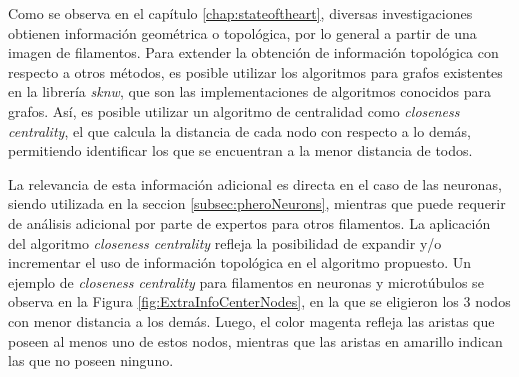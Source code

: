Como se observa en el cap\'itulo \ref{chap:stateoftheart}, diversas investigaciones obtienen informaci\'on geom\'etrica o topol\'ogica, por lo general a partir de una imagen de filamentos. Para extender la obtenci\'on de informaci\'on topol\'ogica con respecto a otros m\'etodos, es posible utilizar los algoritmos para grafos existentes en la librer\'ia {\it sknw}, que son las implementaciones de algoritmos conocidos para grafos. As\'i, es posible utilizar un algoritmo de centralidad como {\it closeness centrality}, el que calcula la distancia de cada nodo con respecto a lo dem\'as, permitiendo identificar los que se encuentran a la menor distancia de todos.


La relevancia de esta informaci\'on adicional es directa en el caso de las neuronas, siendo utilizada en la seccion \ref{subsec:pheroNeurons}, mientras que puede requerir de an\'alisis adicional por parte de expertos para otros filamentos. La aplicaci\'on del algoritmo {\it closeness centrality} refleja la posibilidad de expandir y/o incrementar el uso de informaci\'on topol\'ogica en el algoritmo propuesto. Un ejemplo de {\it closeness centrality} para filamentos en neuronas y microt\'ubulos se observa en la Figura \ref{fig:ExtraInfoCenterNodes}, en la que se eligieron los 3 nodos con menor distancia a los dem\'as. Luego, el color magenta refleja las aristas que poseen al menos uno de estos nodos, mientras que las aristas en amarillo indican las que no poseen ninguno.


